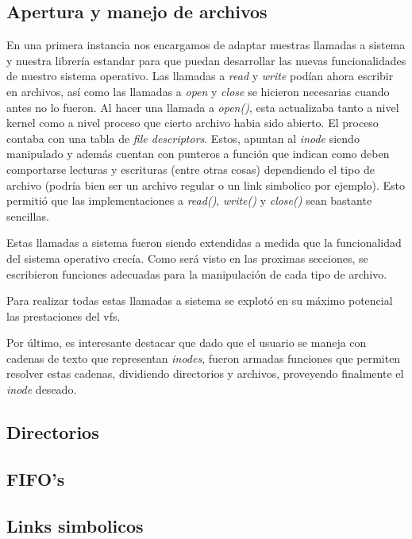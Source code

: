 \documentclass[a4paper,10pt]{article}
\begin{document}
    \subsection{Apertura y manejo de archivos}
    En una primera instancia nos encargamos de adaptar nuestras llamadas a sistema y nuestra librería estandar
    para que puedan desarrollar las nuevas funcionalidades de nuestro sistema operativo. Las llamadas a \textit{read} y
    \textit{write} podían ahora escribir en archivos, así como las llamadas a \textit{open} y \textit{close} se hicieron
    necesarias cuando antes no lo fueron.
    Al hacer una llamada a \textit{open()}, esta actualizaba tanto a nivel kernel como a nivel proceso que cierto
    archivo habia sido abierto. El proceso contaba con una tabla de \textit{file descriptors}. Estos, apuntan al 
    \textit{inode} siendo manipulado y además cuentan con punteros a función que indican como deben comportarse lecturas
    y escrituras (entre otras cosas) dependiendo el tipo de archivo (podría bien ser un archivo regular o un link 
    simbolico por ejemplo). Esto permitió que las implementaciones a \textit{read()}, \textit{write()} y \textit{close()}
    sean bastante sencillas. 
    
    Estas llamadas a sistema fueron siendo extendidas a medida que la funcionalidad del sistema operativo crecía. Como
    será visto en las proximas secciones, se escribieron funciones adecuadas para la manipulación de cada tipo de archivo.
    
    Para realizar todas estas llamadas a sistema se explotó en su máximo potencial las prestaciones del vfs.
    
    Por último, es interesante destacar que dado que el usuario se maneja con cadenas de texto que representan 
    \textit{inodes}, fueron armadas funciones que permiten resolver estas cadenas, dividiendo directorios y archivos,
    proveyendo finalmente el \textit{inode} deseado. 

    \subsection{Directorios}

    \subsection{FIFO's}

    \subsection{Links simbolicos}
    
\end{document}
